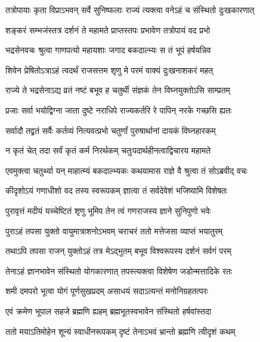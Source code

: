 \twolineshloka
{तत्रोपायाः कृता विप्राऽभवन् सर्वे सुनिष्फलाः}
{राज्यं त्यक्त्वा वनेऽहं च संस्थितो दुःखकारणात्} %

\twolineshloka
{शङ्करं सम्भजंस्तत्र दर्शनं ते महामते}
{प्राप्तस्तपः प्रभावेण तत्रोपायं वद प्रभो} %


\twolineshloka
{भद्रसेनवचः श्रुत्वा गाणपत्यो महायशाः}
{जगाद बकदाल्भ्यः स तं भूपं हर्षयन्निव} %


\twolineshloka
{शिवेन प्रेषितोऽत्राऽहं त्वदर्थं राजसत्तम}
{श‍ृणु मे परमं वाक्यं दुःखनाशकरं महत्} %

\twolineshloka
{राज्ये ते भद्रसेनाऽद्य व्रतं नष्टं बभूव ह}
{चतुर्थी संज्ञकं तेन विघ्नयुक्तोऽसि साम्प्रतम्} %

\twolineshloka
{प्रजाः सर्वा भयोद्विग्ना जाता दुष्टे नराधिपे}
{राज्यकर्तरि रे पापिन् नरके गच्छसि ह्यतः} %

\twolineshloka
{सर्वादौ तद्व्रतं सर्वैः कर्तव्यं नित्यवत्प्रभो}
{चतुर्णां पुरुषार्थानां दायकं विघ्नहारकम्} %

\twolineshloka
{न कृतं चेत् तदा सर्वं कृतं कर्म निरर्थकम्}
{चतुःपदार्थहीनत्वाद्विचारय महामते} %

\twolineshloka
{एवमुक्त्वा चतुर्थ्या यन् माहात्म्यं बकदाल्भ्यकः}
{कथयामास राज्ञे वै श्रुत्वा तं सोऽब्रवीद् वचः} %


\twolineshloka
{कीदृशोऽयं गणाधीशो वद तस्य स्वरूपकम्}
{ज्ञात्वा तं सर्वदेवेशं भजिष्यामि विशेषतः} %


\twolineshloka
{पुरावृत्तं मदीयं यच्चेष्टितं श‍ृणु भूमिप}
{तेन त्वं गणराजस्य ज्ञाने सुनिपुणो भवेः} %

\twolineshloka
{पुराऽहं तपसा युक्तो वायुमात्राशनोऽभवम्}
{चराचरं ततो मत्तेजसा व्याप्तं भयातुरम्} %

\twolineshloka
{तथाऽपि तपसा राजन् युक्तोऽहं तत्र मेऽद्भुतम्}
{बभूव विश्वरूपस्य दर्शनं सर्वगं परम्} %

\twolineshloka
{तेनाऽहं ज्ञानभावेन संस्थितो योगकारणात्}
{तपस्त्यक्त्वा विशेषेण जडोन्मत्तादिके रतः} %

\twolineshloka
{शमी दमपरो भूत्वा योगं पूर्णसुखप्रदम्}
{असाधयं सदाऽत्यन्तं मनोनिग्रहतत्परः} %

\twolineshloka
{एवं क्रमेण भूपाल सहजे ब्रह्मणि ह्यहम्}
{ब्रह्मभूतस्वभावेन संस्थितो हर्षवांस्तदा} %

\twolineshloka
{ततो मयाऽतिमोहेन शून्यं स्वाधीनरूपकम्}
{दृष्टं तेनाऽभवं भ्रान्तो ब्रह्मणि त्वीदृशं कथम्} %

